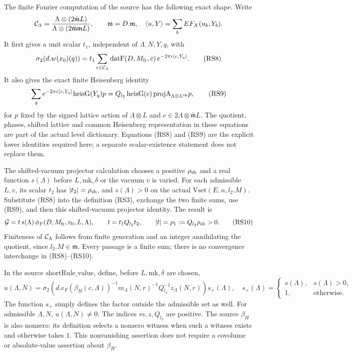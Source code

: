 The finite Fourier computation of the source has the
following exact shape.  Write
\[
 {\cal C}_\Lambda=
 \frac{\Lambda\otimes(2\bar{\mathfrak m}L)}
      {\Lambda\otimes(2\bar{\mathfrak m}\mathfrak m L)},
       \qquad\mathfrak m=D.\mathfrak m,
 \quad
 \langle u,Y\rangle=\sum_b EF_X(u_b,Y_b).
\]
It first gives a unit scalar \(t_1\), independent of
\(\Lambda,N,Y,q\), with
\[
 \sigma_2(d.w(x_0)(q))
   =t_1\sum_{c\in{\cal C}_\Lambda}
       \mathrm{datF}(D,M_{\rm fr},c)\,
                   e^{-2\pi i\langle c,Y_q\rangle}.
 \tag{RS8}\label{eq:sr-source-cover-fourier-reading}
\]
It also gives the exact finite Heisenberg identity
\[
 \sum_q e^{-2\pi i\langle c,Y_q\rangle}
                         \mathrm{heisG}(Y_q)p
      =Q_{l_2}\,\mathrm{heisG}(c)\,
           \mathrm{projA}_{\Lambda\otimes L^{\rm sh}}p ,
 \tag{RS9}\label{eq:sr-source-roots-finite-fourier}
\]
for \(p\) fixed by the signed lattice action of
\(\Lambda\otimes L\) and \(c\in2\Lambda\otimes\bar{\mathfrak m}L\).
The quotient, phases, shifted lattice and common
Heisenberg representation in these equations are part
of the actual level dictionary.
Equations (RS8) and (RS9) are the explicit lower identities
required here; a separate scalar-existence statement
does not replace them.

The shifted-vacuum projector calculation chooses a
positive \(\rho_{\rm sh}\) and a real function
\(s(\Lambda)\) before \(L,\mathrm{mk},\delta\) or the
vacuum \(v\) is varied.  For each admissible \(L,v\),
its scalar \(t_2\) has
\(|t_2|=\rho_{\rm sh}\), and \(s(\Lambda)>0\)
on the actual \(\mathrm{Vset}(E,n,l_2.M)\).
Substitute (RS8) into the definition (RS3), exchange
the two finite sums, use (RS9), and then this
shifted-vacuum projector identity.  The result is
\[
 {\cal G}=
       t\,s(\Lambda)\,
        \phi_F(D,M_{\rm fr},v_0,L,\Lambda),
 \qquad
 t=t_1Q_{l_2}t_2,\qquad
 |t|=\rho_1:=Q_{l_2}\rho_{\rm sh}>0.
 \tag{RS10}\label{eq:sr-source-gphi-phiF-scalar}
\]
Finiteness of \({\cal C}_\Lambda\) follows from finite
generation and an integer annihilating the quotient,
since \(l_2.M\in\mathfrak m\).
Every passage is a finite sum; there is no convergence
interchange in (RS8)--(RS10).

In the source \(\mathrm{shortRule\_value}\), define,
before \(L,\mathrm{mk},\delta\) are chosen,
\[
 u(\Lambda,N)=
  \sigma_2\!\left(
      d.e_F(\beta_H(c,\Lambda))^{-1}
                   m_\Lambda(N,r)^{-1}Q_{l_2}^{-1}
                   z_\Lambda(N,r)\right)s_+(\Lambda),
 \quad
 s_+(\Lambda)=
  \begin{cases}s(\Lambda),&s(\Lambda)>0,\\1,&\text{otherwise.}\end{cases}
 \tag{RS11}\label{eq:sr-source-uniform-lattice-reading-factor}
\]
The function \(s_+\) simply defines the factor outside
the admissible set as well.
For admissible \(\Lambda,N\), \(u(\Lambda,N)\ne0\).
The indices \(m,z,Q_{l_2}\) are positive.
The source \(\beta_H\) is also nonzero: its definition
selects a nonzero witness when such a witness exists
and otherwise takes \(1\).
This nonvanishing assertion does not require a
covolume or absolute-value assertion about \(\beta_H\).

